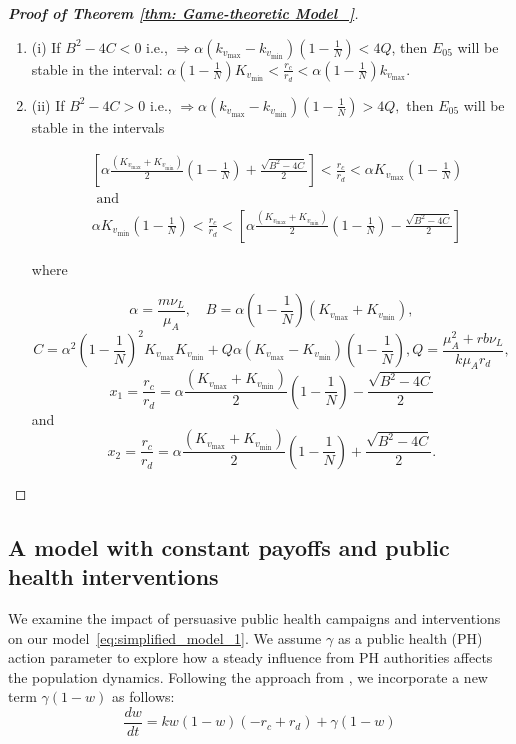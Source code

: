 \documentclass{article}
\theoremstyle{remark}
\theoremstyle{custom} %
\begin{document}
\begin{proof}[\textbf{Proof of Theorem \ref{thm: Game-theoretic Model_}}]
\begin{enumerate}

\item[] (i) If $B^2-4 C<0$ i.e., $\Rightarrow \alpha\left(k_{v_{\max }}-k_{v_{\min }}\right)\left(1-\frac{1}{N}\right)<4 Q$, then $E_{05}$ will be stable in the interval: 
$\alpha\left(1-\frac{1}{N}\right) K_{v_{\min }}<\frac{r_c}{r_d}<\alpha\left(1-\frac{1}{N}\right) k_{v_{\max }}$.  


\item[] (ii) If $B^2-4 C>0$ i.e., $\Rightarrow \alpha\left(k_{v_{\max }}-k_{v_{\min }}\right)\left(1-\frac{1}{N}\right)>4 Q,$ then $E_{05}$ will be stable in the intervals 

$$
\begin{aligned}
&\left[\alpha \frac{\left(K_{v_{\max }}+K_{v_{\min }}\right)}{2} \left(1-\frac{1}{N}\right)+\frac{\sqrt{B^2-4 C}}{2}\right]<\frac{r_c}{r_d}<\alpha  K_{v_{\max }} \left(1-\frac{1}{N}\right)\\
&\text { and }\\
&\alpha K_{v_{\min }} \left(1-\frac{1}{N}\right)<\frac{r_c}{r_d}<\left[\alpha \frac{\left(K_{v_{\max }}+K_{v_{\min }}\right)}{2} \left(1-\frac{1}{N}\right)-\frac{\sqrt{B^2-4 C}}{2}\right]
\end{aligned}
$$


where

$$
\alpha=\frac{m \nu_L}{\mu_A}, \quad B=\alpha\left(1-\frac{1}{N}\right)\left(K_{v_{\max }}+K_{v_{\min }}\right),
$$
$$
C=\alpha^2\left(1-\frac{1}{N}\right)^2 K_{v_{\max }} K_{v_{\min }}+Q\alpha \left(K_{v_{\max }}-K_{v_{\min }}\right)\left(1-\frac{1}{N}\right), Q=\frac{\mu_A^2+r b \nu_L}{k \mu_A r_d},
$$
$$
x_1=\frac{r_c}{r_d}=\alpha \frac{\left(K_{v_{\max }}+K_{v_{\min }}\right)}{2} \left(1-\frac{1}{N}\right)-\frac{\sqrt{B^2-4 C}}{2}
$$
and
$$
x_2=\frac{r_c}{r_d}=\alpha \frac{\left(K_{v_{\max }}+K_{v_{\min }}\right)}{2} \left(1-\frac{1}{N}\right)+\frac{\sqrt{B^2-4 C}}{2}.
$$
 \end{enumerate}   
\end{proof}

\newpage
\subsection{A model with constant payoffs and public health interventions}


 We examine the impact of persuasive public health campaigns and interventions on our model~\eqref{eq:simplified_model_1}. We assume $\gamma$ as a public health (PH) action parameter to explore how a steady influence from PH authorities affects the population dynamics. Following the approach from \cite {asfaw_itn_control}, we incorporate a new term $\gamma(1-w)$ as follows:
\begin{equation}
\label{eq:PH_extension}
\frac{dw}{dt} = kw(1 - w)(-r_c + r_d) + \gamma(1 - w) 
\end{equation}
\end{document}
